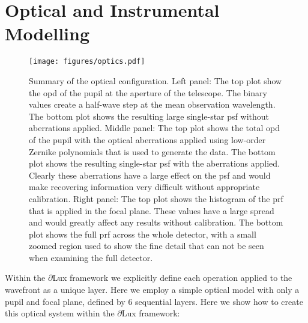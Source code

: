 \documentclass[]{spieman}
\begin{document}
\section{Optical and Instrumental Modelling}
\label{sec:simulation}

\begin{figure*}
    \centering
    \texttt{[image: figures/optics.pdf]}
    \caption{Summary of the optical configuration. Left panel: The top plot show the \ac{opd} of the pupil at the aperture of the telescope. The binary values create a half-wave step at the mean observation wavelength. The bottom plot shows the resulting large single-star \ac{psf} without aberrations applied. Middle panel: The top plot shows the total \ac{opd} of the pupil with the optical aberrations applied using low-order Zernike polynomials that is used to generate the data. The bottom plot shows the resulting single-star \ac{psf} with the aberrations applied. Clearly these aberrations have a large effect on the \ac{psf} and would make recovering information very difficult without appropriate calibration. Right panel: The top plot shows the histogram of the \ac{prf} that is applied in the focal plane. These values have a large spread and would greatly affect any results without calibration. The bottom plot shows the full \ac{prf} across the whole detector, with a small zoomed region used to show the fine detail that can not be seen when examining the full detector.}
    \label{fig:optics}
\end{figure*}


Within the $\partial$Lux framework we explicitly define each operation applied to the wavefront as a unique layer. Here we employ a simple optical model with only a pupil and focal plane, defined by 6 sequential layers. Here we show how to create this optical system within the $\partial$Lux framework:
\end{document}
